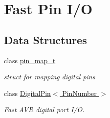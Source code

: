 \hypertarget{group__digital_pin}{\section{Fast Pin I/\-O}
\label{group__digital_pin}
}
\subsection*{Data Structures}
\begin{DoxyCompactItemize}
\item 
class \hyperlink{structpin__map__t}{pin\-\_\-map\-\_\-t}
\begin{DoxyCompactList}\small\item\em struct for mapping digital pins \end{DoxyCompactList}\item 
class \hyperlink{class_digital_pin}{Digital\-Pin$<$ Pin\-Number $>$}
\begin{DoxyCompactList}\small\item\em Fast A\-V\-R digital port I/\-O. \end{DoxyCompactList}\end{DoxyCompactItemize}
